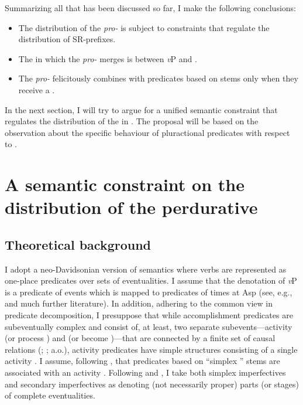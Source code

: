 \documentclass[output=paper,colorlinks,citecolor=brown,newtxmath]{langsci/langscibook}
\begin{document}
Summarizing all that has been discussed so far, I make the following conclusions:

\begin{itemize}
    \item The distribution of the  \textit{pro-} is subject to constraints that regulate the distribution of SR-prefixes.
\item The  in which the  \textit{pro-} merges is between \textit{v}P and .
\item The  \textit{pro-} felicitously combines with predicates based on   stems only when they receive a .
\end{itemize}

\noindent In the next section, I will try to argue for a unified semantic constraint that regulates the distribution of the  in . The proposal will be based on the observation about the specific behaviour of pluractional predicates with respect to  .

\section{A semantic constraint on the distribution of the perdurative} \label{sec:naumov:3}
\subsection{Theoretical background} \label{sec:naumov:3.1}

I adopt a neo-Davidsonian version of  semantics where verbs are represented as one-place predicates over sets of eventualities. I assume that the denotation of \textit{v}P is a predicate of events which is mapped to predicates of times at Asp (see, e.g., \citealt{wolfgang1994time} and much further literature). In addition, adhering to the common view in predicate decomposition, I presuppose that while accomplishment predicates are subeventually complex and consist of, at least, two separate subevents—activity (or process ) and  (or become )—that are connected by a finite set of causal relations (\citealt{dowty1979word}; \citealt{rothstein2004structuring}; a.o.), activity predicates have simple structures consisting of a single activity . I assume, following \citet{pazelskaya2006}, that predicates based on ``simplex ''  stems are associated with an activity . Following \citet{altshuler2013,altshuler2014} and \citet{gronn2003semantics, gronn2013}, I take both simplex imperfectives and secondary imperfectives as denoting (not necessarily proper) parts (or stages) of complete eventualities.
\end{document}
